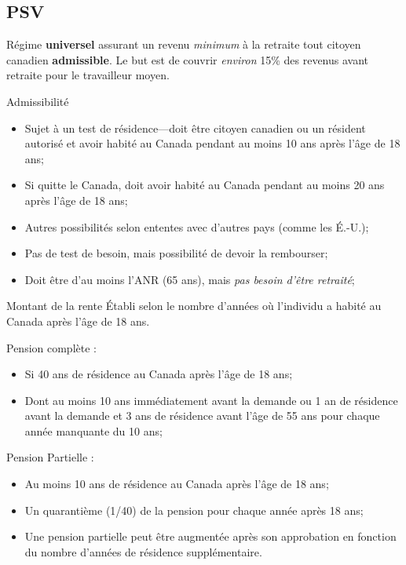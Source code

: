 \documentclass[10pt, french]{article}
\begin{document}
\begin{multicols*}{3}
\subsection{PSV}
\begin{definitionNOHFILL}[Définition]
Régime \textbf{universel} assurant un revenu \textit{minimum} à la retraite tout citoyen canadien \textbf{admissible}. Le but est de couvrir \textit{environ} 15\% des revenus avant retraite pour le travailleur moyen.
\end{definitionNOHFILL}

\begin{conceptgen}{Admissibilité}
\begin{itemize}[leftmargin = *]
	\item	Sujet à un test de résidence---doit être citoyen canadien ou un résident autorisé et avoir habité au Canada pendant au moins 10 ans après l'âge de 18 ans;
	\item	Si quitte le Canada, doit avoir habité au Canada pendant au moins 20 ans après l'âge de 18 ans;
	\item	Autres possibilités selon ententes avec d'autres pays (comme les É.-U.);
	\item	Pas de test de besoin, mais possibilité de devoir la rembourser;
	\item	Doit être d'au moins l'ANR (65 ans), mais \textit{pas besoin d'être retraité};
\end{itemize}
\end{conceptgen}

\begin{conceptgen}{Montant de la rente}
Établi selon le nombre d'années où l'individu a habité au Canada après l'âge de 18 ans.

Pension complète :
\begin{itemize}[leftmargin = *]
	\item	Si 40 ans de résidence au Canada après l'âge de 18 ans;
	\item	Dont au moins 10 ans immédiatement avant la demande ou 1 an de résidence avant la demande et 3 ans de résidence avant l'âge de 55 ans pour chaque année manquante du 10 ans; 
\end{itemize}

Pension Partielle :
\begin{itemize}[leftmargin = *]
	\item	Au moins 10 ans de résidence au Canada après l'âge de 18 ans;
	\item	Un quarantième (1/40) de la pension pour chaque année après 18 ans;
	\item	Une pension partielle peut être augmentée après son approbation en fonction du nombre d'années de résidence supplémentaire.
\end{itemize}
\end{conceptgen}


\end{multicols*}
\end{document}
